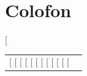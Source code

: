 {{\section*{Colofon}
[%
\renewcommand{\arraystretch}{1.35}
\begin{tabular}{@{}p{4.2cm}p{10cm}@{}}
  [%
  [%
  [%
  [%
  [%
  [%
  [%
  [%
  [%
  [%
  [%
  [%
\end{tabular}
\renewcommand{\arraystretch}{1.0}

}}
